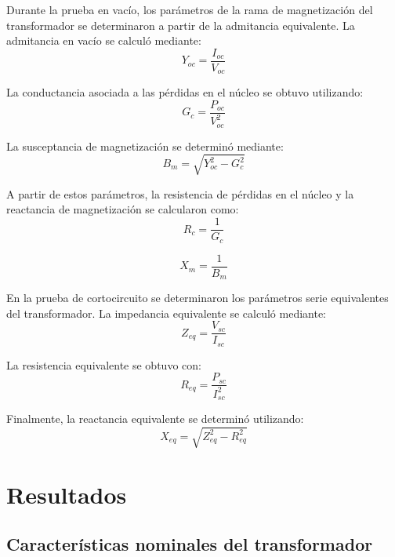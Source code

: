 \documentclass[conference]{IEEEtran}
\begin{document}
Durante la prueba en vacío, los parámetros de la rama de magnetización del transformador se determinaron a partir de la admitancia equivalente. La admitancia en vacío se calculó mediante:
\begin{equation}
    Y_{oc} = \frac{I_{oc}}{V_{oc}}
\end{equation}

La conductancia asociada a las pérdidas en el núcleo se obtuvo utilizando:
\begin{equation}
    G_c = \frac{P_{oc}}{V_{oc}^2}
\end{equation}

La susceptancia de magnetización se determinó mediante:
\begin{equation}
    B_m = \sqrt{Y_{oc}^2 - G_c^2}
\end{equation}

A partir de estos parámetros, la resistencia de pérdidas en el núcleo y la reactancia de magnetización se calcularon como:
\begin{equation}
    R_c = \frac{1}{G_c}
\end{equation}

\begin{equation}
    X_m = \frac{1}{B_m}
\end{equation}

En la prueba de cortocircuito se determinaron los parámetros serie equivalentes del transformador. La impedancia equivalente se calculó mediante:
\begin{equation}
    Z_{eq} = \frac{V_{sc}}{I_{sc}}
\end{equation}

La resistencia equivalente se obtuvo con:
\begin{equation}
    R_{eq} = \frac{P_{sc}}{I_{sc}^2}
\end{equation}

Finalmente, la reactancia equivalente se determinó utilizando:
\begin{equation}
    X_{eq} = \sqrt{Z_{eq}^2 - R_{eq}^2}
\end{equation}

\section{Resultados}

\subsection{Características nominales del transformador}
\end{document}
